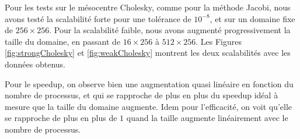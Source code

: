 \documentclass{article}
\begin{document}
Pour les tests sur le mésocentre Cholesky, comme pour la méthode Jacobi, nous avons testé la scalabilité forte pour une tolérance de $10^{-8}$, et sur un domaine fixe de $256\times 256$. Pour la scalabilité faible, nous avons augmenté progressivement la taille du domaine, en passant de $16\times 256$ à $512\times 256$. Les Figures \ref{fig:strongCholesky} et \ref{fig:weakCholesky} montrent les deux scalabilités avec les données obtenus.

Pour le speedup, on observe bien une augmentation quasi linéaire en fonction du nombre de processus, et qui se rapproche de plus en plus du speedup idéal à mesure que la taille du domaine augmente. Idem pour l'efficacité, on voit qu'elle se rapproche de plus en plus de $1$ quand la taille augmente linéairement avec le nombre de processus.
\end{document}
